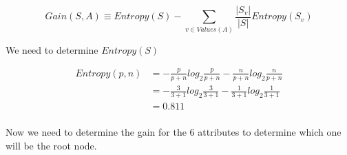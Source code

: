 \documentclass[10pt,a4paper]{article}
\begin{document}
\begin{equation}
Gain(S,A) \equiv Entropy(S) - \sum_{v \in Values(A)} \frac{\vert S_v\vert}{\vert S\vert}Entropy(S_v)
\end{equation}

We need to determine $Entropy(S)$

\begin{equation}
\begin{split}
Entropy(p,n) &=  -\frac{p}{p+n}log_2\frac{p}{p+n} - \frac{n}{p+n}log_2\frac{n}{p+n}  \\
           &= -\frac{3}{3+1} log_2\frac{3}{3+1} -\frac{1}{3+1} log_2\frac{1}{3+1} \\
           &= 0.811   \\
\end{split}
\end{equation}

Now we need to determine the gain for the 6 attributes to determine which one will be the root node.
\end{document}
